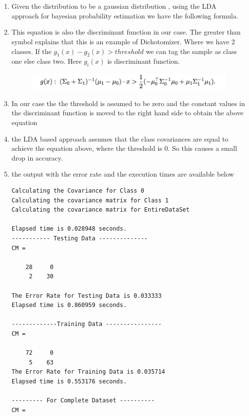 \documentclass[10pt, letterpaper]{article}
\begin{document}
\section{}
\begin{enumerate}
\item Given the distribution to be a gaussian distribution , using the LDA approach for bayesian probability estimation we have the following formula.
\item This equation is also the discriminant function in our case. The greater than symbol explains that this is an example of Dichotomizer. Where we have 2 classes. If the $g_{1}(x) - g_{2}(x) > threshold$ we can tag the sample as class one else class two. Here $g_{i}(x)$ is discriminant function. 

\begin{figure}[h!]
\centering
\includegraphics[scale=0.5]{LDABased}
\end{figure}
\item In our case the the threshold is assumed to be zero and the constant values in the discriminant function is moved to the right hand side to obtain the above equation 

\item the LDA based approach assumes that the class covariances are equal to achieve the equation above, where the threshold is 0. So this causes a small drop in accuracy.

\item the output with the error rate and the execution times are available below
\begin{verbatim}
Calculating the Covariance for Class 0
Calculating the covariance matrix for Class 1
Calculating the covariance matrix for EntireDataSet

Elapsed time is 0.028948 seconds.
----------- Testing Data --------------
CM =

    28     0
     2    30

The Error Rate for Testing Data is 0.033333
Elapsed time is 0.860959 seconds.

-------------Training Data ----------------
CM =

    72     0
     5    63
The Error Rate for Training Data is 0.035714
Elapsed time is 0.553176 seconds.

--------- For Complete Dataset ----------
CM =


\end{verbatim}
\end{enumerate}
\end{document}
